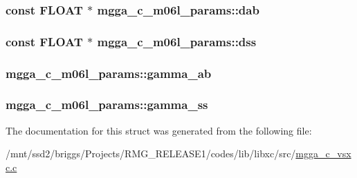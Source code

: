 \hypertarget{structmgga__c__m06l__params_aad8af0a6eb75716eaa474b849b0d10e0}{
\subsubsection[{dab}]{\setlength{\rightskip}{0pt plus 5cm}const {\bf F\-L\-O\-A\-T} $\ast$ mgga\-\_\-c\-\_\-m06l\-\_\-params\-::dab}}\label{structmgga__c__m06l__params_aad8af0a6eb75716eaa474b849b0d10e0}
\hypertarget{structmgga__c__m06l__params_af80cb08635dd1594ae4352e797ca1543}{
\subsubsection[{dss}]{\setlength{\rightskip}{0pt plus 5cm}const {\bf F\-L\-O\-A\-T} $\ast$ mgga\-\_\-c\-\_\-m06l\-\_\-params\-::dss}}\label{structmgga__c__m06l__params_af80cb08635dd1594ae4352e797ca1543}
\hypertarget{structmgga__c__m06l__params_a98ef42b76af9bbb1cfed0292cbd30d84}{
\subsubsection[{gamma\-\_\-ab}]{ mgga\-\_\-c\-\_\-m06l\-\_\-params\-::gamma\-\_\-ab}}\label{structmgga__c__m06l__params_a98ef42b76af9bbb1cfed0292cbd30d84}
\hypertarget{structmgga__c__m06l__params_abbe6771a61c5531107612f73e50ceb99}{
\subsubsection[{gamma\-\_\-ss}]{ mgga\-\_\-c\-\_\-m06l\-\_\-params\-::gamma\-\_\-ss}}\label{structmgga__c__m06l__params_abbe6771a61c5531107612f73e50ceb99}


The documentation for this struct was generated from the following file\-:\begin{DoxyCompactItemize}
\item 
/mnt/ssd2/briggs/\-Projects/\-R\-M\-G\-\_\-\-R\-E\-L\-E\-A\-S\-E1/codes/lib/libxc/src/\hyperlink{mgga__c__vsxc_8c}{mgga\-\_\-c\-\_\-vsxc.\-c}\end{DoxyCompactItemize}
